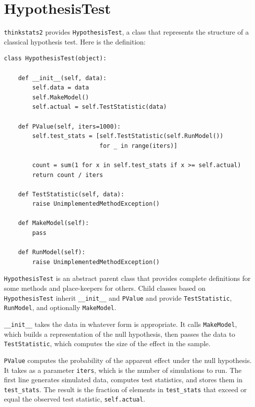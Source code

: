 \documentclass[12pt]{book}
\theoremstyle{exercise}
\begin{document}
\section{HypothesisTest}%
\label{hypotest}%

{\tt thinkstats2} provides {\tt HypothesisTest}, a
class that represents the structure of a classical hypothesis
test.  Here is the definition:%

\begin{verbatim}
class HypothesisTest(object):

    def __init__(self, data):
        self.data = data
        self.MakeModel()
        self.actual = self.TestStatistic(data)

    def PValue(self, iters=1000):
        self.test_stats = [self.TestStatistic(self.RunModel()) 
                           for _ in range(iters)]

        count = sum(1 for x in self.test_stats if x >= self.actual)
        return count / iters

    def TestStatistic(self, data):
        raise UnimplementedMethodException()

    def MakeModel(self):
        pass

    def RunModel(self):
        raise UnimplementedMethodException()
\end{verbatim}

{\tt HypothesisTest} is an abstract parent class that provides
complete definitions for some methods and place-keepers for others.
Child classes based on {\tt HypothesisTest} inherit \verb"__init__"
and {\tt PValue} and provide {\tt TestStatistic},
{\tt RunModel}, and optionally {\tt MakeModel}.%

\verb"__init__" takes the data in whatever form is appropriate.  It
calls {\tt MakeModel}, which builds a representation of the null
hypothesis, then passes the data to {\tt TestStatistic}, which
computes the size of the effect in the sample.%
%

{\tt PValue} computes the probability of the apparent effect under
the null hypothesis.  It takes as a parameter {\tt iters}, which is
the number of simulations to run.  The first line generates simulated
data, computes test statistics, and stores them in
\verb"test_stats".
The result is
the fraction of elements in \verb"test_stats" that
exceed or equal the observed test statistic, {\tt self.actual}.%
\end{document}
